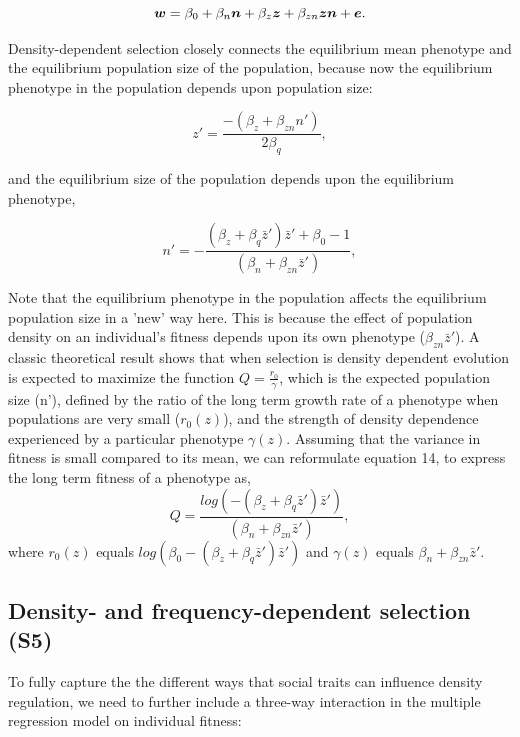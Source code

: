 \documentclass{article}
\begin{document}
\begin{equation} \label{eq: DDRS}
\vectorsym{w}=\beta_{0} +\beta_{n} \vectorsym{n} + \beta_{z} \vectorsym{z}+  \beta_{zn} \vectorsym{zn}  +  \vectorsym{e}.
\end{equation}

\noindent Density-dependent selection closely connects the equilibrium mean phenotype and the equilibrium population size of the population, because now the equilibrium phenotype in the population depends upon population size:

\begin{equation} 
z'=\frac{-(\beta_{z}+\beta_{zn}n')}{2\beta_{q}},
\end{equation} 

and the equilibrium size of the population depends upon the equilibrium phenotype,

\begin{equation}
		n' = -\frac{(\beta_{z}  +  \beta_{q}\bar{z}')\bar{z}'+\beta_{0} -1}{(\beta_{n} +  \beta_{zn} \bar{z}')},
\end{equation}

\noindent Note that the equilibrium phenotype in the population affects the equilibrium population size in a 'new' way here. This is because the effect of population density on an individual's fitness depends upon its own phenotype ($\beta_{zn} \bar{z}'$). A classic theoretical result \citep{MacArthur1962, Engen2013} shows that when selection is density dependent evolution is expected to maximize the function $Q=\frac{r_0}{\gamma}$, which is the expected population size (n'), defined by the ratio of the long term growth rate of a phenotype when populations are very small ($r_0(z)$), and the strength of density dependence experienced by a particular phenotype $\gamma(z)$.  Assuming that the variance in fitness is small compared to its mean, we can reformulate equation 14, to express the long term fitness of a phenotype as,  $$Q=\frac{log(-(\beta_{z}  +  \beta_{q}\bar{z}')\bar{z}')}{(\beta_{n} +  \beta_{zn} \bar{z}')},$$ where  $r_0(z)$ equals $log(\beta_{0}-(\beta_{z}  +  \beta_{q}\bar{z}')\bar{z}')$ and $\gamma(z)$ equals $\beta_{n} +  \beta_{zn} \bar{z}'$.

\subsection{Density- and frequency-dependent selection (S5)}

To fully capture the the different ways that social traits can influence density regulation, we need to further include a three-way interaction in the multiple regression model on individual fitness:
\end{document}
